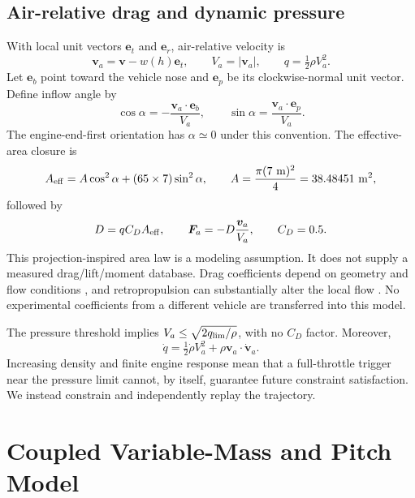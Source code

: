 \documentclass[11pt,a4paper]{article}
\newcommand{\vect}[1]{\bm{#1}}
\newcommand{\er}{\vect e_r}
\newcommand{\et}{\vect e_t}
\newcommand{\eb}{\vect e_b}
\newcommand{\ep}{\vect e_p}
\begin{document}
\subsection{Air-relative drag and dynamic pressure}
With local unit vectors $\et$ and $\er$, air-relative velocity is
\begin{equation}
 \vect v_a=\vect v-w(h)\et,\qquad V_a=|\vect v_a|,
 \qquad q=\tfrac12\rho V_a^2.
\end{equation}
Let $\eb$ point toward the vehicle nose and $\ep$ be its clockwise-normal unit vector. Define inflow angle by
\begin{equation}
 \cos\alpha=-\frac{\vect v_a\cdot\eb}{V_a},\qquad
 \sin\alpha=\frac{\vect v_a\cdot\ep}{V_a}.
\end{equation}
The engine-end-first orientation has $\alpha\simeq0$ under this convention. The effective-area closure is
\begin{equation}
 A_{\rm eff}=A\cos^2\alpha+(65\times7)\sin^2\alpha,
 \qquad A=\frac{\pi(7\ \mathrm{m})^2}{4}=38.48451\ \mathrm{m}^2,
\label{eq:area}
\end{equation}
followed by
\begin{equation}
 D=qC_DA_{\rm eff},\qquad \vect F_a=-D\frac{\vect v_a}{V_a},\qquad C_D=0.5.
\label{eq:drag}
\end{equation}
This projection-inspired area law is a modeling assumption. It does not supply a measured drag/lift/moment database. Drag coefficients depend on geometry and flow conditions \cite{drag}, and retropropulsion can substantially alter the local flow \cite{retro}. No experimental coefficients from a different vehicle are transferred into this model.

The pressure threshold implies $V_a\le\sqrt{2q_{\rm lim}/\rho}$, with no $C_D$ factor. Moreover,
\begin{equation}
 \dot q=\tfrac12\dot\rho V_a^2+\rho\vect v_a\cdot\dot{\vect v}_a.
\end{equation}
Increasing density and finite engine response mean that a full-throttle trigger near the pressure limit cannot, by itself, guarantee future constraint satisfaction. We instead constrain and independently replay the trajectory.

\section{Coupled Variable-Mass and Pitch Model}
\label{sec:model}
\end{document}
